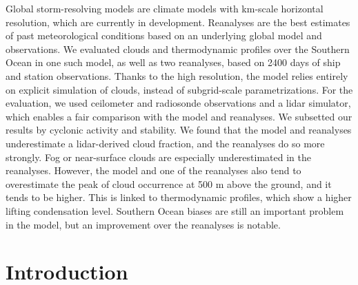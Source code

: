 \documentclass[draft]{agujournal2019}
\begin{document}
Global storm-resolving models are climate models with km-scale horizontal resolution, which are currently in development. Reanalyses are the best estimates of past meteorological conditions based on an underlying global model and observations. We evaluated clouds and thermodynamic profiles over the Southern Ocean in one such model, as well as two reanalyses, based on 2400 days of ship and station observations. Thanks to the high resolution, the model relies entirely on explicit simulation of clouds, instead of subgrid-scale parametrizations. For the evaluation, we used ceilometer and radiosonde observations and a lidar simulator, which enables a fair comparison with the model and reanalyses. We subsetted our results by cyclonic activity and stability. We found that the model and reanalyses underestimate a lidar-derived cloud fraction, and the reanalyses do so more strongly. Fog or near-surface clouds are especially underestimated in the reanalyses. However, the model and one of the reanalyses also tend to overestimate the peak of cloud occurrence at 500 m above the ground, and it tends to be higher. This is linked to thermodynamic profiles, which show a higher lifting condensation level. Southern Ocean biases are still an important problem in the model, but an improvement over the reanalyses is notable.

\section{Introduction}
\label{sec:introduction}
\end{document}
